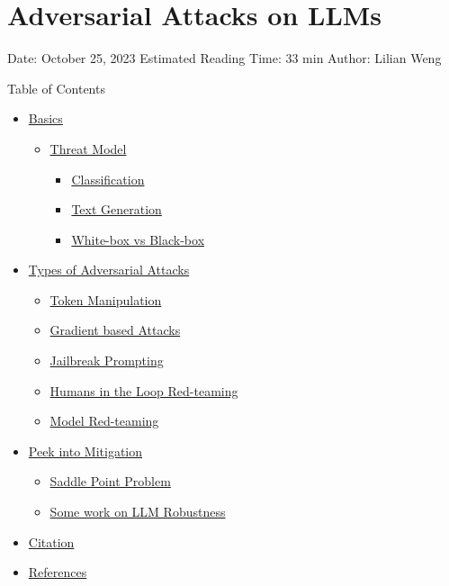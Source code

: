 \section{Adversarial Attacks on LLMs}\label{adversarial-attacks-on-llms}

Date: October 25, 2023 \textbar{} Estimated Reading Time: 33 min \textbar{} Author: Lilian Weng

{Table of Contents}

\begin{itemize}
\tightlist
\item
  \hyperref[basics]{Basics}

  \begin{itemize}
  \tightlist
  \item
    \hyperref[threat-model]{Threat Model}

    \begin{itemize}
    \tightlist
    \item
      \hyperref[classification]{Classification}
    \item
      \hyperref[text-generation]{Text Generation}
    \item
      \hyperref[white-box-vs-black-box]{White-box vs Black-box}
    \end{itemize}
  \end{itemize}
\item
  \hyperref[types-of-adversarial-attacks]{Types of Adversarial Attacks}

  \begin{itemize}
  \tightlist
  \item
    \hyperref[token-manipulation]{Token Manipulation}
  \item
    \hyperref[gradient-based-attacks]{Gradient based Attacks}
  \item
    \hyperref[jailbreak-prompting]{Jailbreak Prompting}
  \item
    \hyperref[humans-in-the-loop-red-teaming]{Humans in the Loop Red-teaming}
  \item
    \hyperref[model-red-teaming]{Model Red-teaming}
  \end{itemize}
\item
  \hyperref[peek-into-mitigation]{Peek into Mitigation}

  \begin{itemize}
  \tightlist
  \item
    \hyperref[saddle-point-problem]{Saddle Point Problem}
  \item
    \hyperref[some-work-on-llm-robustness]{Some work on LLM Robustness}
  \end{itemize}
\item
  \hyperref[citation]{Citation}
\item
  \hyperref[references]{References}
\end{itemize}

